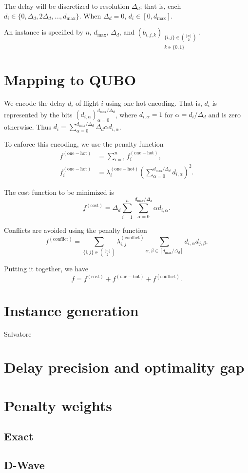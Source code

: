 \documentclass[twocolumn]{article}
\newcommand{\func}[1]{f^{(\mathrm{#1})}}
\newcommand{\penweight}[1]{\lambda^{(\mathrm{#1})}}
\newcommand{\dmax}{d_{\max}}
\begin{document}
The delay will be discretized to resolution $\Delta_d$; that is, each $d_i \in \{0, \Delta_d, 2\Delta_d, \ldots, \dmax\}$.
When $\Delta_d = 0$, $d_i \in [0, \dmax]$.

An instance is specified by $n$, $\dmax$, $\Delta_d$, and ${\left(b_{i, j, k}\right)}_{\substack{\{i, j\} \in \binom{[n]}{2} \\ k \in \{0, 1\}}}$.

\section{Mapping to QUBO}

We encode the delay $d_i$ of flight $i$ using one-hot encoding.
That is, $d_i$ is represented by the bits 
${\left( d_{i,\alpha}\right)}_{\alpha=0}^{\dmax/\Delta_d}$, where $d_{i,\alpha} = 1$ for $\alpha = d_i / \Delta_d$ and is zero otherwise.
Thus $d_i = \sum_{\alpha=0}^{\dmax / \Delta_d} \Delta_d \alpha d_{i,\alpha}$.

To enforce this encoding, we use the penalty function
\begin{align}
\func{one-hot} 
&= \sum_{i = 1}^n \func{one-hot}_i,  \\
\func{one-hot}_i 
&= 
\penweight{one-hot}_i 
{\left(\sum_{\alpha = 0}^{\dmax / \Delta_d} d_{i, \alpha}\right)}^2.
\end{align}

The cost function to be minimized is 
\begin{equation}
\func{cost} = 
\Delta_d \sum_{i = 1}^n \sum_{\alpha = 0}^{\dmax / \Delta_d} \alpha d_{i, \alpha}.
\end{equation}

Conflicts are avoided using the penalty  function
\begin{equation}
\func{conflict} = 
\sum_{\{i, j\} \in \binom{[n]}{2}}
\penweight{conflict}_{i, j}
\sum_{\alpha, \beta \in [\dmax/\Delta_d]} d_{i,\alpha} d_{j, \beta}.
\end{equation}

Putting it together, we have
\begin{equation}
  f = \func{cost} + \func{one-hot} + \func{conflict}.
\end{equation}



\section{Instance generation}
Salvatore

\section{Delay precision and optimality gap}


\section{Penalty weights} 

\subsection{Exact}

\subsection{D-Wave}
\end{document}
